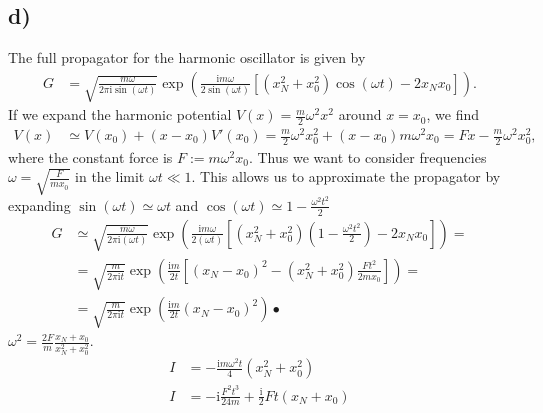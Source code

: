 \documentclass[english, parskip=full]{scrartcl}
\newcommand{\kla}{}
\newcommand{\klam}{}
\renewcommand{\i}{\text{i}}
\begin{document}
\subsection*{d)}
The full propagator for the harmonic oscillator is given by
\begin{align}
G &= \sqrt{\frac{m\omega}{2\pi\i\sin (\omega t)}}\exp\kla\left( \frac{\i m\omega}{2\sin (\omega t)}\klam\left[ (x_N^2 + x_0^2)\cos(\omega t) - 2x_Nx_0 \right] \right).
\end{align}
If we expand the harmonic potential $V(x) = \frac{m}{2}\omega^2x^2$ around $x=x_0$, we find
\begin{align}
V(x) &\simeq V(x_0) + (x-x_0)V'(x_0) = \frac{m}{2}\omega^2x_0^2 + (x-x_0)m\omega^2 x_0 = Fx - \frac{m}{2}\omega^2x_0^2,
\end{align}
where the constant force is $F := m\omega^2 x_0$.
Thus we want to consider frequencies $\omega = \sqrt{\frac{F}{mx_0}}$ in the limit $\omega t \ll 1$.
This allows us to approximate the propagator by expanding $\sin(\omega t)\simeq \omega t$ and $\cos(\omega t) \simeq 1 - \frac{\omega^2t^2}{2}$
\begin{align}
G &\simeq \sqrt{\frac{m\omega}{2\pi\i (\omega t)}} \exp\kla\left( \frac{\i m\omega}{2(\omega t)}\klam\left[ (x_N^2 + x_0^2)\kla\left( 1 - \frac{\omega^2t^2}{2} \right) - 2x_Nx_0 \right] \right) = \\
&= \sqrt{\frac{m}{2\pi\i t}} \exp\kla\left( \frac{\i m}{2t}\klam\left[ (x_N - x_0)^2 - (x_N^2 + x_0^2)\frac{Ft^2}{2mx_0} \right] \right) = \\ 
&=  \sqrt{\frac{m}{2\pi\i t}} \exp\kla\left( \frac{\i m}{2t}(x_N - x_0)^2 \right)•
\end{align}
$\omega^2 = \frac{2F}{m}\frac{x_N + x_0}{x_N^2 + x_0^2}$.
\begin{align}
I &= -\frac{\i m\omega^2t}{4}(x_N^2 + x_0^2)\\
I &= -\i \frac{F^2t^3}{24m} + \frac{\i}{2} Ft(x_N + x_0) 
\end{align}
\end{document}
